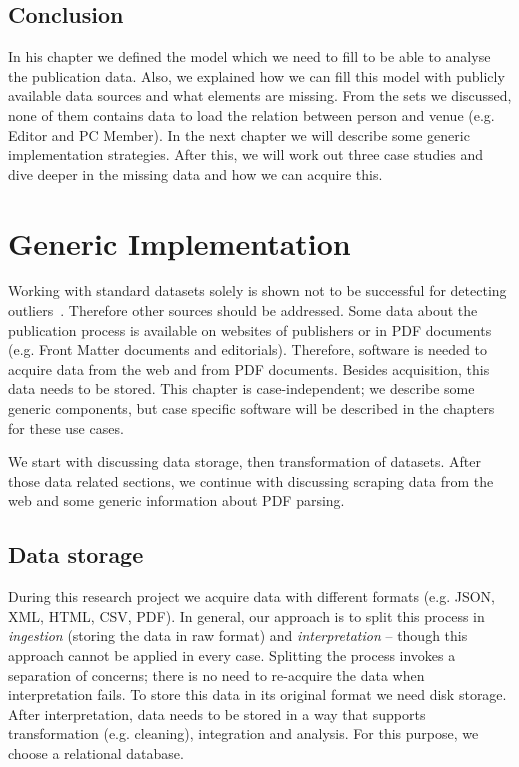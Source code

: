 \documentclass{ou-report}
\begin{document}
\section{Conclusion}
In his chapter we defined the model which we need to fill to be able to 
analyse the publication data. Also, we explained how we can fill this model
with publicly available data sources and what elements are missing. From the 
sets we discussed, none of them contains data to load the relation between 
person and venue (e.g. Editor and PC Member).
In the next chapter we will describe some generic implementation strategies.
After this, we will work out three case studies and dive deeper in 
the missing data and how we can acquire this.



\chapter{Generic Implementation}
\label{chp:generic_implementation}

Working with standard datasets solely is shown not to be successful for 
detecting outliers~\cite{TEJ2017}.
Therefore other sources should be addressed. Some data about the publication 
process is available on websites of publishers or in PDF documents (e.g. Front 
Matter documents and editorials).
Therefore, software is needed to acquire data from the web and 
from PDF documents. 
Besides acquisition, this data needs to be stored. This 
chapter is case-independent; we describe some generic components, but case 
specific software will be described in the chapters for these use cases.

We start with discussing data storage, then transformation of datasets. After
those data related sections, we continue with discussing scraping data from the 
web and some generic information about PDF parsing.

\section{Data storage}
During this research project we acquire data with different formats (e.g. JSON, 
XML, HTML, CSV, PDF). In general, our approach is to split 
this process in \textit{ingestion} (storing the data in raw format) and
\textit{interpretation} -- though this approach cannot be applied in every case. 
Splitting the process invokes a separation of concerns; there is no need to
re-acquire the data when interpretation fails. To store this data in its
original format we need disk storage. After interpretation, data needs to be
stored in a way that supports transformation (e.g. cleaning), integration and
analysis. For this purpose, we choose a relational database.
\end{document}
